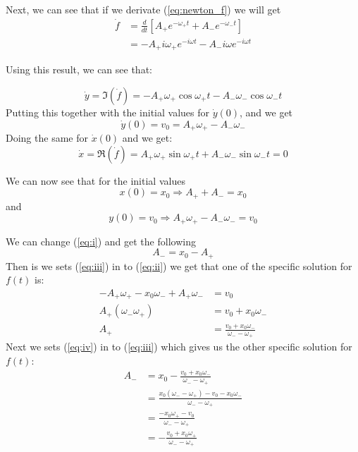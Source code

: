 \documentclass[english,notitlepage,reprint,nofootinbib]{revtex4-1}  %
\begin{document}
	Next, we can see that if we derivate (\ref{eq:newton_f}) we will get
	\begin{align*}
		\dot{f} &= \frac{d}{dt} \left[ A_+ e^{- \omega_+ t} + A_- e^{- \omega_- t}  \right] \\
		&= -A_+ i \omega_+ e^{-i \omega t} - A_- i \omega e^{-i \omega t}
	\end{align*}
	
	Using this result, we can see that:
	
	\begin{equation*}
		\dot{y} = \Im( \dot{f} ) = -A_+ \omega_+ \cos \omega_+ t - A_- \omega_- \cos \omega_- t
	\end{equation*}
	Putting this together with the initial values for $\dot{y} (0)$, and we get
	\begin{equation*}
		\dot{y} (0) = v_0 = A_+ \omega_+ - A_- \omega_- 
	\end{equation*}
	Doing the same for $\dot{x} (0)$ and we get:
	\begin{equation*}
		\dot{x} = \Re ( \dot{f} ) = A_+ \omega_+ \sin \omega_+ t + A_- \omega_- \sin \omega_- t = 0
	\end{equation*}
	
	We can now see that for the initial values
	\begin{equation} \label{eq:i}
		x(0) = x_0 \Rightarrow A_+ + A_- = x_0
	\end{equation}
	and
	\begin{equation} \label{eq:ii}
		y(0) = v_0 \Rightarrow A_+ \omega_+ - A_- \omega_- = v_0
	\end{equation}
	
	We can change (\ref{eq:i}) and get the following
	\begin{equation} \label{eq:iii}
		A_- = x_0 - A_+
	\end{equation}
	Then is we sets (\ref{eq:iii}) in to (\ref{eq:ii}) we get that one of the specific solution for $f(t)$ is:
	\begin{align} \label{eq:iv}
		-A_+ \omega_+ - x_0 \omega_- + A_+ \omega_- &= v_0 \nonumber \\
		A_+ (\omega_- \omega_+) &= v_0 + x_0 \omega_- \nonumber \\
		A_+ &= \frac{v_0 + x_0 \omega_-}{\omega_- - \omega_+}
	\end{align}
	Next we sets (\ref{eq:iv}) in to (\ref{eq:iii}) which gives us the other specific solution for $f(t)$:
	\begin{align*}
		A_- &= x_0 - \frac{v_0 + x_0 \omega_-}{\omega_- - \omega_+} \\
		&= \frac{x_0 (\omega_- - \omega_+) - v_0 - x_0 \omega_-}{\omega_- - \omega_+} \\
		&= \frac{-x_0 \omega_+ - v_0}{\omega_- - \omega_+} \\
		&= - \frac{v_0 + x_0 \omega_+}{\omega_- - \omega_+}
	\end{align*}
	
\end{document}
